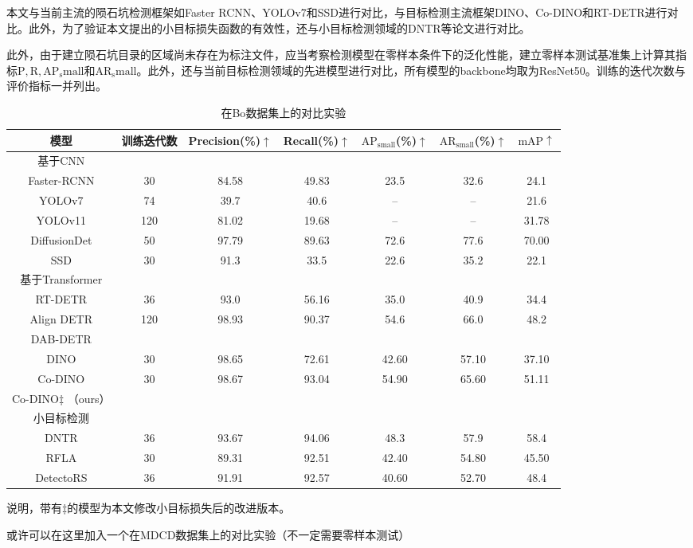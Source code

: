 本文与当前主流的陨石坑检测框架如Faster RCNN、YOLOv7和SSD进行对比，与目标检测主流框架DINO、Co-DINO和RT-DETR进行对比。此外，为了验证本文提出的小目标损失函数的有效性，还与小目标检测领域的DNTR等论文进行对比。
\par 此外，由于建立陨石坑目录的区域尚未存在为标注文件，应当考察检测模型在零样本条件下的泛化性能，建立零样本测试基准集\cite{boCatalogueMeterscaleImpact2022}上计算其指标$\mathrm{P,R,AP_small}$和$\mathrm{AR_small}$。此外，还与当前目标检测领域的先进模型进行对比，所有模型的backbone均取为ResNet50。训练的迭代次数与评价指标一并列出。
\begin{table}[H]
  \begin{center}
  \caption{在Bo\cite{boCatalogueMeterscaleImpact2022}数据集上的对比实验}
  \label{tab:detect-comp}
  \begin{tabular}{ c  c  c  c  c  c c}
  \toprule
  模型 & 训练迭代数 & 
  Precision(\%)$\uparrow$ & Recall(\%)$\uparrow$ & $\mathrm{AP}_\mathrm{small}$(\%)$\uparrow$ & $\mathrm{AR}_\mathrm{small}$(\%)$\uparrow$& $\mathrm{mAP}\uparrow$ \\
  \hline
  基于CNN & & & & & & \\
  Faster-RCNN & 30 & 84.58 & 49.83 & 23.5 & 32.6 & 24.1\\
  YOLOv7 & 74 & 39.7 & 40.6 & -- & -- & 21.6 \\
  YOLOv11 & 120 & 81.02 & 19.68 & -- & -- & 31.78\\
  DiffusionDet &50 & 97.79 & 89.63 & 72.6 & 77.6 & 70.00  \\
  SSD & 30 & 91.3 &33.5 &22.6 &35.2&22.1 \\
  \hline
  基于Transformer & & & & && \\
  RT-DETR & 36 & 93.0 & 56.16 & 35.0 & 40.9& 34.4\\
  Align DETR&120 & 98.93 & 90.37 & 54.6 & 66.0 & 48.2\\
  DAB-DETR & & & & & &\\
  DINO &30 &98.65 &72.61 &42.60 &57.10 &37.10\\
  Co-DINO &30 &98.67 & 93.04 & 54.90 & 65.60 & 51.11\\
  Co-DINO$\ddagger$ （ours）& & & & & &\\
  \hline
  小目标检测 & & & & & & \\
  DNTR\cite{liuDeNoisingFPNTransformer2024}& 36 & 93.67 & 94.06 & 48.3 & 57.9 & 58.4  \\
  RFLA\cite{xuRFLAGaussianReceptive2022} & 30 & 89.31 & 92.51 & 42.40 & 54.80 & 45.50 \\
  DetectoRS\cite{Qiao2020DetectoRSDO} & 36  & 91.91 & 92.57 & 40.60 & 52.70 & 48.4 \\
  \bottomrule 
  \end{tabular}
  \end{center}
\end{table}
说明，带有$\ddagger$的模型为本文修改小目标损失后的改进版本。
\par 或许可以在这里加入一个在MDCD数据集上的对比实验（不一定需要零样本测试）

